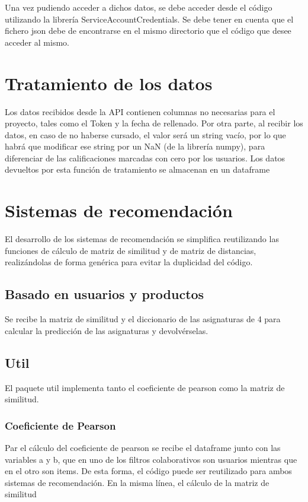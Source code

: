 Una vez pudiendo acceder a dichos datos, se debe acceder desde el código utilizando la librería ServiceAccountCredentials. Se debe tener en cuenta que el fichero json debe de encontrarse en el mismo directorio que el código que desee acceder al mismo. 


\section{Tratamiento de los datos}
Los datos recibidos desde la API contienen columnas no necesarias para el proyecto, tales como el Token y la fecha de rellenado. Por otra parte, al recibir los datos, en caso de no haberse cursado, el valor será un string vacío, por lo que habrá que modificar ese string por un NaN (de la librería numpy), para diferenciar de las calificaciones marcadas con cero por los usuarios.   Los datos devueltos por esta función de tratamiento se almacenan en un dataframe

\section{Sistemas de recomendación}
El desarrollo de los sistemas de recomendación se simplifica reutilizando las funciones de cálculo de matriz de similitud y de matriz de distancias, realizándolas de forma genérica para evitar la duplicidad del código. 
\subsection{Basado en usuarios y productos}
Se recibe la matriz de similitud y el diccionario de las asignaturas de 4 para calcular la predicción de las asignaturas y devolvérselas. 
\subsection{Util}
El paquete util implementa tanto el coeficiente de pearson como la matriz de similitud. 
\subsubsection{Coeficiente de Pearson}
Par el cálculo del coeficiente de pearson se recibe el dataframe junto con las variables a y b, que en uno de los filtros colaborativos son usuarios mientras que en el otro son items. De esta forma, el código puede ser reutilizado para ambos sistemas de recomendación. 
En la misma línea, el cálculo de la matriz de similitud